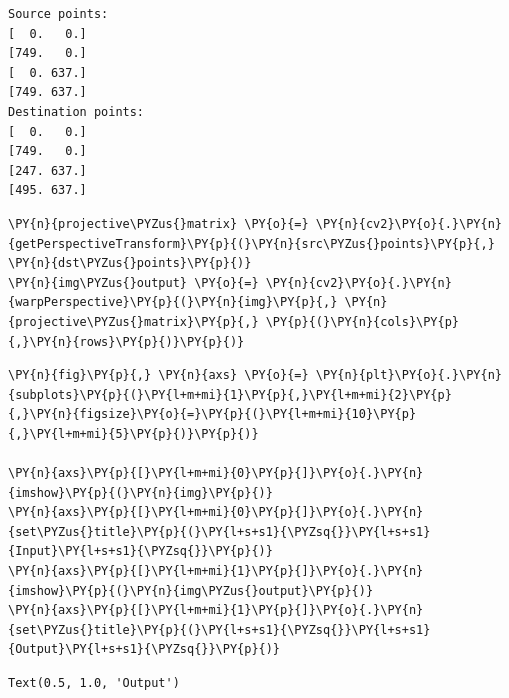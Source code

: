 \begin{Verbatim}[commandchars=\\\{\}]
Source points:
[  0.   0.]
[749.   0.]
[  0. 637.]
[749. 637.]
Destination points:
[  0.   0.]
[749.   0.]
[247. 637.]
[495. 637.]
\end{Verbatim}

\begin{tcolorbox}[breakable, size=fbox, boxrule=1pt, pad at break*=1mm,colback=cellbackground, colframe=cellborder]
	\begin{Verbatim}[commandchars=\\\{\}]
\PY{n}{projective\PYZus{}matrix} \PY{o}{=} \PY{n}{cv2}\PY{o}{.}\PY{n}{getPerspectiveTransform}\PY{p}{(}\PY{n}{src\PYZus{}points}\PY{p}{,} \PY{n}{dst\PYZus{}points}\PY{p}{)}
\PY{n}{img\PYZus{}output} \PY{o}{=} \PY{n}{cv2}\PY{o}{.}\PY{n}{warpPerspective}\PY{p}{(}\PY{n}{img}\PY{p}{,} \PY{n}{projective\PYZus{}matrix}\PY{p}{,} \PY{p}{(}\PY{n}{cols}\PY{p}{,}\PY{n}{rows}\PY{p}{)}\PY{p}{)}
	\end{Verbatim}
\end{tcolorbox}
\vspace{0.5cm}
\begin{tcolorbox}[breakable, size=fbox, boxrule=1pt, pad at break*=1mm,colback=cellbackground, colframe=cellborder]
	\begin{Verbatim}[commandchars=\\\{\}]
\PY{n}{fig}\PY{p}{,} \PY{n}{axs} \PY{o}{=} \PY{n}{plt}\PY{o}{.}\PY{n}{subplots}\PY{p}{(}\PY{l+m+mi}{1}\PY{p}{,}\PY{l+m+mi}{2}\PY{p}{,}\PY{n}{figsize}\PY{o}{=}\PY{p}{(}\PY{l+m+mi}{10}\PY{p}{,}\PY{l+m+mi}{5}\PY{p}{)}\PY{p}{)}

\PY{n}{axs}\PY{p}{[}\PY{l+m+mi}{0}\PY{p}{]}\PY{o}{.}\PY{n}{imshow}\PY{p}{(}\PY{n}{img}\PY{p}{)}
\PY{n}{axs}\PY{p}{[}\PY{l+m+mi}{0}\PY{p}{]}\PY{o}{.}\PY{n}{set\PYZus{}title}\PY{p}{(}\PY{l+s+s1}{\PYZsq{}}\PY{l+s+s1}{Input}\PY{l+s+s1}{\PYZsq{}}\PY{p}{)}
\PY{n}{axs}\PY{p}{[}\PY{l+m+mi}{1}\PY{p}{]}\PY{o}{.}\PY{n}{imshow}\PY{p}{(}\PY{n}{img\PYZus{}output}\PY{p}{)}
\PY{n}{axs}\PY{p}{[}\PY{l+m+mi}{1}\PY{p}{]}\PY{o}{.}\PY{n}{set\PYZus{}title}\PY{p}{(}\PY{l+s+s1}{\PYZsq{}}\PY{l+s+s1}{Output}\PY{l+s+s1}{\PYZsq{}}\PY{p}{)}
	\end{Verbatim}
\end{tcolorbox}

\begin{tcolorbox}[breakable, size=fbox, boxrule=.5pt, pad at break*=1mm, opacityfill=0]
\begin{Verbatim}[commandchars=\\\{\}]
Text(0.5, 1.0, 'Output')
\end{Verbatim}
\end{tcolorbox}

